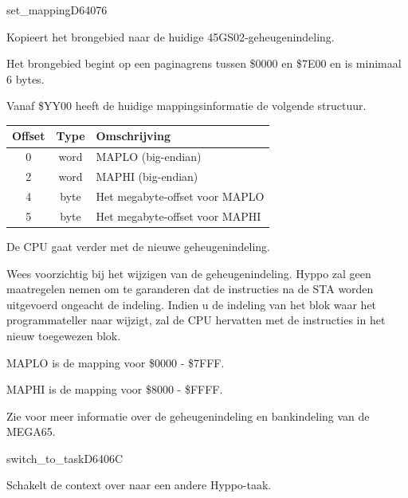 \newpage
\begin{hyppotrap}{set\_mapping}{D640}{76}

\item [Dienst:]  Kopieert het brongebied naar de huidige 45GS02-geheugenindeling.
\item [Voorwaarden:]  Het brongebied begint op een paginagrens tussen \$0000 en \$7E00 en is minimaal 6 bytes.
\item [Invoer:]  

  \raggedright Vanaf \$YY00 heeft de huidige mappingsinformatie de volgende structuur.  {\setlength{\tabcolsep}{2mm}
  \begin{tabular}{|c|c|p{6.9cm}|}
  \hline
  \textbf{Offset} & \textbf{Type} & \textbf{Omschrijving} \\
  \hline
  0 & word & MAPLO (big-endian) \\  2 & word & MAPHI (big-endian) \\  4 & byte & Het megabyte-offset voor MAPLO \\  5 & byte & Het megabyte-offset voor MAPHI \\
  \hline
  \end{tabular}
  }

\item [Nawerkingen:]  De CPU gaat verder met de nieuwe geheugenindeling.
\item [Foutcodes:]  
\item [Geschiedenis:]
\item [Opmerkingen:]  Wees voorzichtig bij het wijzigen van de geheugenindeling. Hyppo zal geen maatregelen nemen om te garanderen dat de instructies na de STA worden uitgevoerd ongeacht de indeling. Indien u de indeling van het blok waar het programmateller naar wijzigt, zal de CPU hervatten met de instructies in het nieuw toegewezen blok.

  MAPLO is de mapping voor \$0000 - \$7FFF.

  MAPHI is de mapping voor \$8000 - \$FFFF.

  Zie  voor meer informatie over de geheugenindeling en bankindeling van de MEGA65.
\end{hyppotrap}


\newpage
\begin{hyppotrap}{switch\_to\_task}{D640}{6C}
\item [Dienst:]  Schakelt de context over naar een andere Hyppo-taak.
\notimplemented
\end{hyppotrap}


